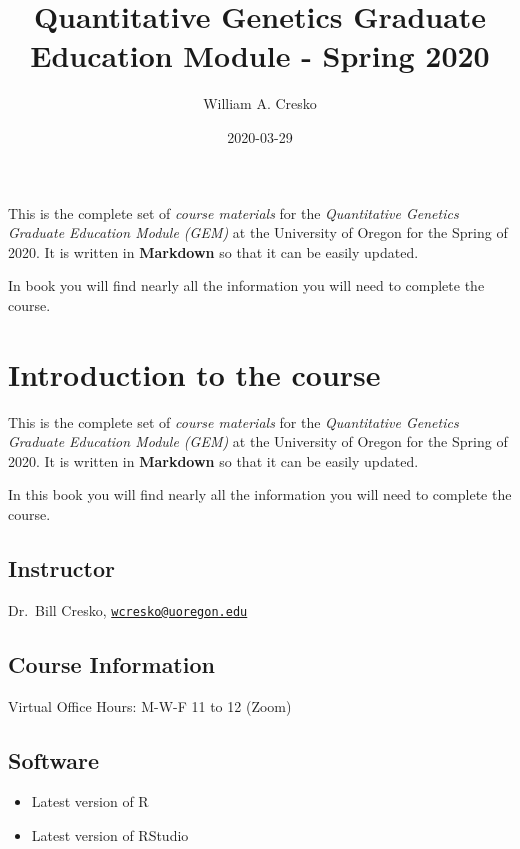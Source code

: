 \documentclass[
]{book}
\title{Quantitative Genetics Graduate Education Module - Spring 2020}
\author{William A. Cresko}
\date{2020-03-29}
\begin{document}
\maketitle

{
\setcounter{tocdepth}{1}
\tableofcontents
}
This is the complete set of \emph{course materials} for the \emph{Quantitative Genetics Graduate Education Module (GEM)} at the University of Oregon for the Spring of 2020. It is written in \textbf{Markdown} so that it can be easily updated.

In book you will find nearly all the information you will need to complete the course.

\hypertarget{introduction-to-the-course}{%
\chapter{Introduction to the course}\label{introduction-to-the-course}}

This is the complete set of \emph{course materials} for the \emph{Quantitative Genetics Graduate Education Module (GEM)} at the University of Oregon for the Spring of 2020. It is written in \textbf{Markdown} so that it can be easily updated.

In this book you will find nearly all the information you will need to complete the course.

\hypertarget{instructor}{%
\section{Instructor}\label{instructor}}

Dr.~Bill Cresko, \href{mailto:wcresko@uoregon.edu}{\nolinkurl{wcresko@uoregon.edu}}

\hypertarget{course-information}{%
\section{Course Information}\label{course-information}}

Virtual Office Hours: M-W-F 11 to 12 (Zoom)

\hypertarget{software}{%
\section{Software}\label{software}}

\begin{itemize}
\item
  Latest version of R
\item
  Latest version of RStudio
\end{itemize}
\end{document}
